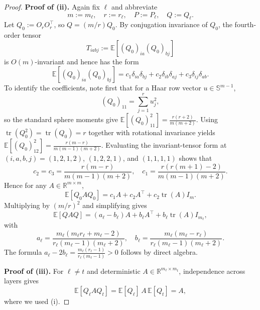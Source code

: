 \documentclass{pkumelon}
\theoremstyle{plain}
\newcommand{\R}{\mathbb{R}}
\newcommand{\E}{\mathbb{E}}
\DeclareMathOperator{\tr}{tr}
\begin{document}
\begin{proof}
\textbf{Proof of (ii). }
Again fix $\ell$ and abbreviate
\begin{equation*}
m:=m_\ell,\quad r:=r_\ell,\quad P:=P_\ell,\quad Q:=Q_\ell.
\end{equation*}
Let $Q_0:=O_rO_r^\top$, so $Q=(m/r)Q_0$. By conjugation invariance of $Q_0$, the fourth-order tensor
\begin{equation*}
T_{iabj}:=\E[(Q_0)_{ia}(Q_0)_{bj}]
\end{equation*}
is $O(m)$-invariant and hence has the form
\begin{equation*}
\E[(Q_0)_{ia}(Q_0)_{bj}] = c_1\delta_{ia}\delta_{bj} +c_2\delta_{ib}\delta_{aj} +c_3\delta_{ij}\delta_{ab}.
\end{equation*}
To identify the coefficients, note first that for a Haar row vector $u\in\mathbb S^{m-1}$,
\begin{equation*}
(Q_0)_{11}=\sum_{j=1}^r u_j^2,
\end{equation*}
so the standard sphere moments give $\E[(Q_0)_{11}^2]=\frac{r(r+2)}{m(m+2)}$. Using $\tr(Q_0^2)=\tr(Q_0)=r$ together with rotational invariance yields $\E[(Q_0)_{12}^2]=\frac{r(m-r)}{m(m-1)(m+2)}$. Evaluating the invariant-tensor form at $(i,a,b,j)=(1,2,1,2)$, $(1,2,2,1)$, and $(1,1,1,1)$ shows that
\begin{equation*}
c_2=c_3=\frac{r(m-r)}{m(m-1)(m+2)}, \quad c_1=\frac{r(r(m+1)-2)}{m(m-1)(m+2)}.
\end{equation*}
Hence for any $A\in\R^{m\times m}$,
\begin{equation*}
\E[Q_0AQ_0] = c_1A+c_2A^\top+c_2\tr(A)I_m.
\end{equation*}
Multiplying by $(m/r)^2$ and simplifying gives
\begin{equation*}
\E[QAQ] = (a_\ell-b_\ell)A+b_\ell A^\top+b_\ell\tr(A)I_{m_\ell},
\end{equation*}
with
\begin{equation*}
a_\ell=\frac{m_\ell(m_\ell r_\ell+m_\ell-2)}{r_\ell(m_\ell-1)(m_\ell+2)}, \quad b_\ell=\frac{m_\ell(m_\ell-r_\ell)}{r_\ell(m_\ell-1)(m_\ell+2)}.
\end{equation*}
The formula $a_\ell-2b_\ell = \frac{m_\ell(r_\ell-1)}{r_\ell(m_\ell-1)}>0$ follows by direct algebra.

\textbf{Proof of (iii). }
For $\ell\neq t$ and deterministic $A\in\R^{m_\ell\times m_t}$, independence across layers gives
\begin{equation*}
\E[Q_\ell A Q_t] = \E[Q_\ell]\,A\,\E[Q_t] = A,
\end{equation*}
where we used (i).


\end{proof}
\end{document}
